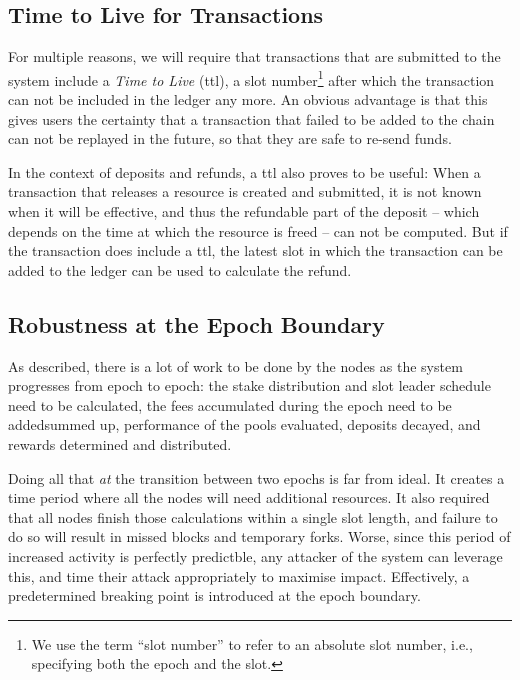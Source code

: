 \documentclass[11pt,a4paper]{article}
\begin{document}
\subsection{Time to Live for Transactions}
\label{time-to-live-for-transactions}

For multiple reasons, we will require that transactions that are submitted to
the system include a \emph{Time to Live} (ttl), a slot number\footnote{We use
  the term ``slot number'' to refer to an absolute slot number, i.e., specifying
  both the epoch and the slot.} after which the transaction can not be included
in the ledger any more. An obvious advantage is that this gives users the
certainty that a transaction that failed to be added to the chain can not be
replayed in the future, so that they are safe to re-send funds.

In the context of deposits and refunds, a ttl also proves to be useful: When a
transaction that releases a resource is created and submitted, it is not known
when it will be effective, and thus the refundable part of the deposit -- which
depends on the time at which the resource is freed -- can not be computed. But
if the transaction does include a ttl, the latest slot in which the transaction
can be added to the ledger can be used to calculate the refund.

\subsection{Robustness at the Epoch Boundary}
\label{robustness-at-the-epoch-boundary}

As described, there is a lot of work to be done by the nodes as the system
progresses from epoch to epoch: the stake distribution and slot leader schedule
need to be calculated, the fees accumulated during the epoch need to be
addedsummed up, performance of the pools evaluated, deposits decayed, and
rewards determined and distributed.

Doing all that \emph{at} the transition between two epochs is far from ideal. It
creates a time period where all the nodes will need additional resources. It
also required that all nodes finish those calculations within a single slot
length, and failure to do so will result in missed blocks and temporary forks.
Worse, since this period of increased activity is perfectly predictble, any
attacker of the system can leverage this, and time their attack appropriately to
maximise impact. Effectively, a predetermined breaking point is introduced at
the epoch boundary.
\end{document}
